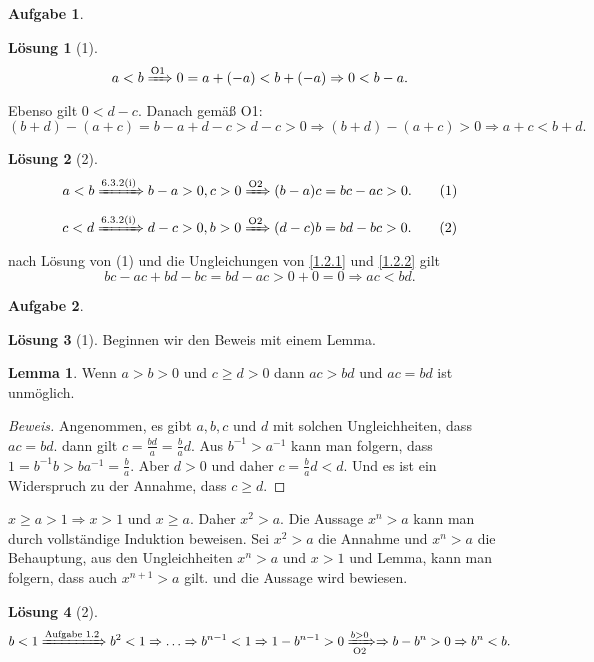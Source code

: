 \documentclass{article}
\theoremstyle{definition}
\newtheorem{ub}{Aufgabe}
\newtheorem*{lo*}{Lösung}
\newtheorem*{lem*}{Lemma}
\begin{document}
\begin{ub}
	\begin{lo*}[1]
		\[ 
		a < b \xRightarrow[]{\text{O1}} 0 = a + (-a) < b + (-a) \Rightarrow 0 < b-a.
		 \]
		Ebenso gilt $ 0 < d - c $. Danach gemäß O1:
		\[ 
		(b+d) - (a+c) = b-a + d-c > d-c > 0 \Rightarrow 
		(b+d) - (a+c) > 0 \Rightarrow
		\boxed{a+c < b+d}.
		 \]
	\end{lo*}
	\begin{lo*}[2]
		\[ 
		a<b \xRightarrow[]{\text{6.3.2(i)}} b-a > 0, c > 0 \xRightarrow[]{\text{O2}} (b-a)c = bc - ac > 0. \tag{1}\label{1.2.1}
		 \]
		\[ 
		c<d \xRightarrow[]{\text{6.3.2(i)}} d-c > 0, b > 0 \xRightarrow[]{\text{O2}} (d-c)b = bd-bc > 0.
		\tag{2}\label{1.2.2}
		 \]
		nach L\"osung von (1) und die Ungleichungen von \ref{1.2.1} und \ref{1.2.2} gilt
		\[ 
		bc - ac + bd - bc = bd - ac > 0 + 0 = 0 \Rightarrow ac < bd.
		 \]
	\end{lo*}
\end{ub}
\begin{ub}
	\begin{lo*}[1]
		Beginnen wir den Beweis mit einem Lemma. 
		\begin{lem*}\label{lemm}
			Wenn \( a > b > 0 \) und \( c \geq d > 0 \) dann \( ac > bd \) und \( ac = bd \) ist unmöglich.
			\begin{proof}[Beweis]
				Angenommen, es gibt $ a,b,c $ und $ d $ mit solchen Ungleichheiten, dass $ ac = bd $.
				dann gilt \( c = \frac{bd}{a} = \frac{b}{a}d \). Aus $ b^{-1} > a^{-1} $ kann man folgern, dass $ 1 = b^{-1}b > ba^{-1} = \frac{b}{a} $.
				Aber $ d > 0 $ und daher $ c = \frac{b}{a}d < d $. Und es ist ein Widerspruch zu der Annahme, dass $ c \geq d $.
			\end{proof} 
		\end{lem*}
		\noindent $ x \geq a > 1 \Rightarrow x > 1 $ und $ x \geq a $. Daher $ x^2 > a $. Die Aussage 
		$ x^n > a $ kann man durch vollständige Induktion beweisen. Sei $ x^2 > a $ die Annahme und
		$ x^n > a $ die Behauptung, aus den Ungleichheiten $ x^n > a $ und $ x > 1 $ und Lemma, kann man folgern, dass auch $ x^{n+1} > a $ gilt. und die Aussage wird bewiesen.
	\end{lo*}
	\begin{lo*}[2]
		\[ 
		b < 1 \xRightarrow[]{\text{Aufgabe 1.2}} b^2 < 1 \Rightarrow \ldots \Rightarrow 
		b^{n-1} < 1 \Rightarrow 1 - b^{n-1} > 0 \xRightarrow[\text{O2}]{b>0}
		\Rightarrow b - b^n > 0 \Rightarrow b^n < b.
		 \]
	\end{lo*}
\end{ub}
\end{document}
